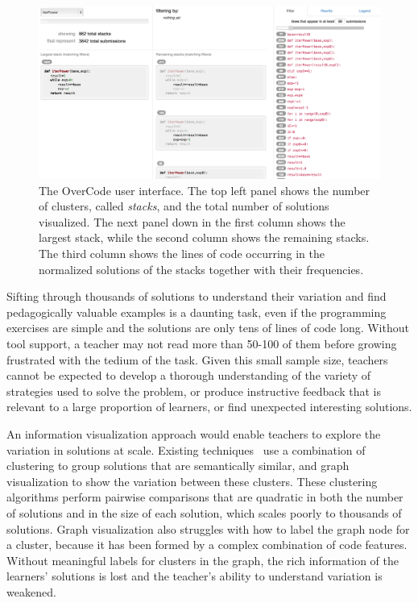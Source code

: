 \begin{figure}[t!]
\centering
\includegraphics[width=1.0\linewidth]{Body/figures/overcode/interfaceScreenShot.png}
\caption{The OverCode user interface. The top left panel shows the number of clusters, called {\it stacks}, and the total number of solutions visualized. The next panel down in the first column shows the largest stack, while the second column shows the remaining stacks. The third column shows the lines of code occurring in the normalized solutions of the stacks together with their frequencies.}
\label{overcode_fullinterface}
\end{figure}

Sifting through thousands of solutions to understand their variation and find pedagogically valuable examples is a daunting task, even if the programming exercises are simple and the solutions are only tens of lines of code long. Without tool support, a teacher may not read more than 50-100 of them before growing frustrated with the tedium of the task. Given this small sample size, teachers cannot be expected to develop a thorough understanding of the variety of strategies used to solve the problem, or produce instructive feedback that is relevant to a large proportion of learners, or find unexpected interesting solutions.

An information visualization approach would enable teachers to explore the variation in solutions at scale. Existing techniques~\cite{gradingsigcse14,MOOCshop,codewebs} use a combination of clustering to group solutions that are semantically similar, and graph visualization to show the variation between these clusters. These clustering algorithms perform pairwise comparisons that are quadratic in both the number of solutions and in the size of each solution, which scales poorly to thousands of solutions. Graph visualization also struggles with how to label the graph node for a cluster, because it has been formed by a complex combination of code features. Without meaningful labels for clusters in the graph, the rich information of the learners' solutions is lost and the teacher's ability to understand variation is weakened.

